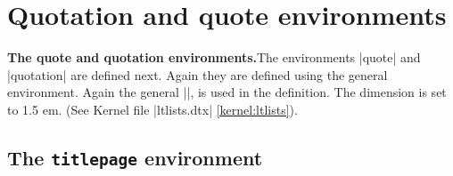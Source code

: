 \section{Quotation and quote environments}
\label{sec:quotationenvironment}

\textbf{The quote and quotation environments.}\quad The environments |quote| and |quotation| are defined next. Again they are defined using the general  environment. Again the general |\list|, is used in the definition. The dimension  is set to 1.5 em. (See Kernel file |ltlists.dtx| \ref{kernel:ltlists}). 


\begin{teX}
\newenvironment{quotation}
               {\list{}{\listparindent 1.5em%
                        \itemindent\listparindent
                        \rightmargin\leftmargin
                        \parsep\z@ \@plus\p@}%
                \item\relax}
               {\endlist}
\end{teX}

\begin{teX}
\newenvironment{quote}
               {\list{}{\rightmargin\leftmargin}%
                \item\relax}
               {\endlist}




\section{The \protect\texttt{titlepage} environment}
\if@compatibility
\newenvironment{titlepage}
    {%
      \cleardoublepage
      \if@twocolumn
        \@restonecoltrue\onecolumn
      \else
        \@restonecolfalse\newpage
      \fi
      \thispagestyle{empty}%
      \setcounter{page}\z@
    }%
    {\if@restonecol\twocolumn \else \newpage \fi
    }
\else
\newenvironment{titlepage}
    {%
      \cleardoublepage
      \if@twocolumn
        \@restonecoltrue\onecolumn
      \else
        \@restonecolfalse\newpage
      \fi
      \thispagestyle{empty}%
      \setcounter{page}\@ne
    }%
    {\if@restonecol\twocolumn \else \newpage \fi
     \if@twoside\else
        \setcounter{page}\@ne
     \fi
    }
\fi
\end{teX}





